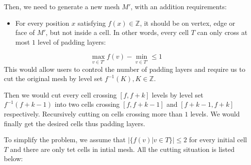 \documentclass[9pt]{extarticle}
\begin{document}
Then, we need to generate a new mesh $M'$, with an addition requirements:
\begin{itemize}
  \item For every position $x$ satisfying $f(x)\in \mathbb{Z}$, it should be on vertex, edge or face of $M'$, but not inside a cell. In other words, every cell $T$ can only cross at most $1$ level of padding layers:
\end{itemize}
\begin{equation}
  \max_{v\in T'} f(v)-\min_{v\in T'}\le 1
\end{equation}
This would allow users to control the number of padding layers and require us to cut the original mesh by level set $f^{-1}(K),K\in \mathbb{Z}$.

Then we would cut every cell crossing $[f,f+k]$
levels by level set $f^{-1}(f+k-1)$ into two cells crossing $[f,f+k-1]$ and
$[f+k-1,f+k]$ respectively. Recursively cutting on cells crossing more than $1$ levels. We would finally get the desired cells thus padding layers.

To simplify the problem, we assume that $|\{f(v) | v\in T \}|\le 2$ for
every initial cell $T$ and there are only tet cells in intial mesh. All the cutting situation is listed below:
\end{document}
